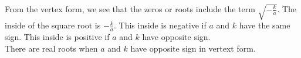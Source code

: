 \documentclass{ximera}
\begin{document}
\begin{observation}



From the vertex form, we see that the zeros or roots include the term $\sqrt{-\frac{k}{a}}$.  The inside of the square root is $-\frac{k}{a}$.  This inside is negative if $a$ and $k$ have the same sign. This inside is positive if $a$ and $k$ have opposite sign. \\

There are real roots when $a$ and $k$ have opposite sign in vertext form. \\



\end{observation}
\end{document}
